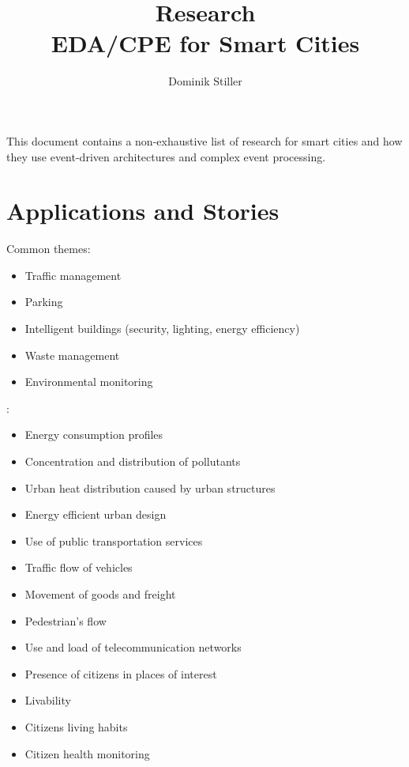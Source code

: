\documentclass[parskip=half]{scrartcl}
\title{Research \\ EDA/CPE for Smart Cities}
\author{Dominik Stiller}
\begin{document}
\maketitle



This document contains a non-exhaustive list of research for smart cities and how they use event-driven architectures and complex event processing.

\section{Applications and Stories}

Common themes:
\begin{itemize}
	\item Traffic management
	\item Parking
	\item Intelligent buildings (security, lighting, energy efficiency)
	\item Waste management
	\item Environmental monitoring
\end{itemize}

\cite[p.~2]{Morales.2015}:
\begin{itemize}
	\item Energy consumption profiles
	\item Concentration and distribution of pollutants
	\item Urban heat distribution caused by urban structures
	\item Energy efficient urban design
	\item Use of public transportation services
	\item Traffic flow of vehicles
	\item Movement of goods and freight
	\item Pedestrian's flow
	\item Use and load of telecommunication networks
	\item Presence of citizens in places of interest
	\item Livability
	\item Citizens living habits
	\item Citizen health monitoring
\end{itemize}
\end{document}

